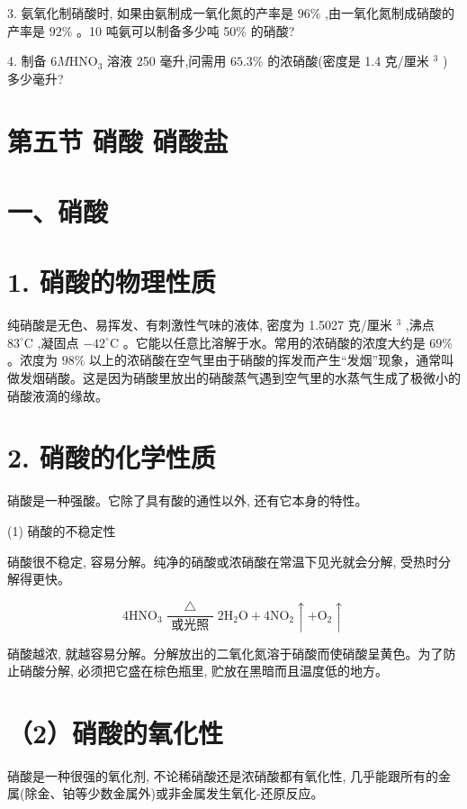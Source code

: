 \documentclass[10pt]{article}
\begin{document}
3. 氨氧化制硝酸时, 如果由氨制成一氧化氮的产率是 \({96}\%\) ,由一氧化氮制成硝酸的产率是 \({92}\%\) 。10 吨氨可以制备多少吨 50\% 的硝酸?

4. 制备 \({6M}{\mathrm{{HNO}}}_{3}\) 溶液 250 毫升,问需用 \({65.3}\%\) 的浓硝酸(密度是 1.4 克/厘米 \({}^{3}\) ) 多少毫升?

\section*{第五节 硝酸 硝酸盐}

\section*{一、硝酸}

\section*{1. 硝酸的物理性质}

纯硝酸是无色、易挥发、有刺激性气味的液体, 密度为 1.5027 克/厘米 \({}^{3}\) ,沸点 \({83}^{ \circ }\mathrm{C}\) ,凝固点 \(- {42}^{ \circ }\mathrm{C}\) 。它能以任意比溶解于水。常用的浓硝酸的浓度大约是 \({69}\%\) 。浓度为 \({98}\%\) 以上的浓硝酸在空气里由于硝酸的挥发而产生“发烟”现象，通常叫做发烟硝酸。这是因为硝酸里放出的硝酸蒸气遇到空气里的水蒸气生成了极微小的硝酸液滴的缘故。

\section*{2. 硝酸的化学性质}

硝酸是一种强酸。它除了具有酸的通性以外, 还有它本身的特性。

(1) 硝酸的不稳定性

硝酸很不稳定, 容易分解。纯净的硝酸或浓硝酸在常温下见光就会分解, 受热时分解得更快。

\[
4{\mathrm{{HNO}}}_{3}\frac{\bigtriangleup }{\text{ 或光照 }}2{\mathrm{H}}_{2}\mathrm{O} + 4{\mathrm{{NO}}}_{2} \uparrow + {\mathrm{O}}_{2} \uparrow
\]

硝酸越浓, 就越容易分解。分解放出的二氧化氮溶于硝酸而使硝酸呈黄色。为了防止硝酸分解, 必须把它盛在棕色瓶里, 贮放在黑暗而且温度低的地方。

\section*{（2）硝酸的氧化性}

硝酸是一种很强的氧化剂, 不论稀硝酸还是浓硝酸都有氧化性, 几乎能跟所有的金属(除金、铂等少数金属外)或非金属发生氧化-还原反应。
\end{document}
